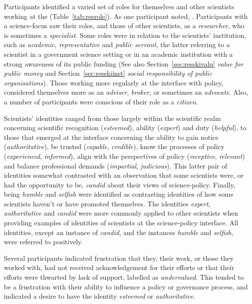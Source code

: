 Participants identified a varied set of roles for themselves and other scientists working at the \SPI (Table~\ref{tab:resrole}). As one participant noted, . Participants with a science-focus saw their roles, and those of other scientists, as a \emph{researcher}, who is sometimes a \emph{specialist}. Some roles were in relation to the scientists' institution, such as \emph{academic}, \emph{representative} and \emph{public servant}, the latter referring to a scientist in a government science setting or in an academic institution with a strong awareness of its public funding (See also Section~\ref{sec:resskivalu} \emph{value for public money} and Section~\ref{sec:resskiinst} \emph{social responsibility of public organisations}). Those working more regularly at the interface with policy, considered themselves more as an \emph{adviser}, \emph{broker}, or sometimes an \emph{advocate}. Also, a number of participants were conscious of their role as a \emph{citizen}.

Scientists' identities ranged from those largely within the scientific realm concerning scientific recognition (\emph{esteemed}), ability (\emph{expert}) and duty (\emph{helpful}), to those that emerged at the interface concerning the ability to gain notice (\emph{authoritative}), be trusted (\emph{capable}, \emph{credible}), know the processes of policy (\emph{experienced}, \emph{informed}), align with the perspectives of policy (\emph{receptive}, \emph{relevant}) and balance professional demands (\emph{impartial}, \emph{judicious}). This latter pair of identities somewhat contrasted with an observation that some scientists were, or had the opportunity to be, \emph{candid} about their views of \CAN{} science-policy. Finally, being \emph{humble} and \emph{selfish} were identified as contrasting identities of how some scientists haven't or have promoted themselves. The identities \emph{expert}, \emph{authoritative} and \emph{candid} were more commonly applied to other scientists when providing examples of identities of scientists at the science-policy interface. All identities, except an instance of \emph{candid}, and the instances \emph{humble} and \emph{selfish}, were referred to positively.

Several participants indicated frustration that they, their work, or those they worked with, had not received acknowledgement for their efforts or that their efforts were thwarted by lack of support, labelled as \emph{undervalued}. This tended to be a frustration with their ability to influence a policy or governance process, and indicated a desire to have the identity \emph{esteemed} or \emph{authoritative}.

